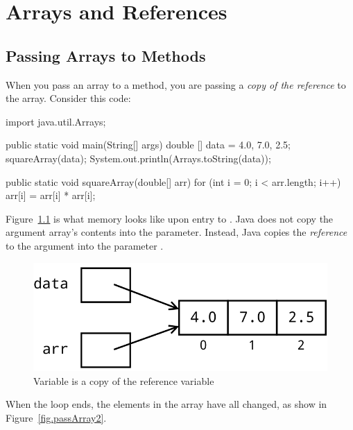 \chapter{Arrays and References}

\section{Passing Arrays to Methods}

When you pass an array to a method, you are passing a {\em copy of the reference} to the array. Consider this code:

\begin{code}
import java.util.Arrays;

public static void main(String[] args) {
    double [] data = {4.0, 7.0, 2.5};
    squareArray(data);
    System.out.println(Arrays.toString(data));
}

public static void squareArray(double[] arr) {
    for (int i = 0; i < arr.length; i++) {
        arr[i] = arr[i] * arr[i];
    }
}
\end{code}

Figure~\ref{fig.passArray1} is what memory looks like upon entry to . Java does not copy the argument array's contents into the parameter. Instead, Java copies the {\em reference} to the argument  into the parameter .

\begin{figure}[!h]
\begin{center}
\includegraphics[scale=0.5]{figs/ch07/pass_to_array1.png}
\caption{Variable  is a copy of the reference variable }
\label{fig.passArray1}
\end{center}
\end{figure}

When the loop ends, the elements in the array have all changed, as show in Figure~\ref{fig.passArray2}.

